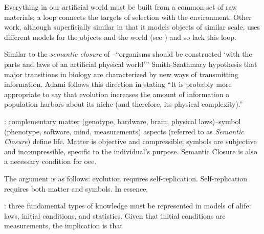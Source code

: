 \begin{NOTES}
Everything in our artificial world must be built from a common set of raw materials; a loop connects the targets of selection with the environment. Other work, although superficially similar in that it models objects of similar scale, uses different models for the objects and the world (see \parencite{Sanchez-Dehesa:2008uq}) and so lack this loop.

Similar to the \emph{semantic closure} of \cite{Pattee1995a}--``organisms should be constructed `with the parts and laws of an artificial physical world''' \cite{Taylor2001}
Smith-Szathmary hypothesis that major transitions in biology are characterized by new ways of transmitting information. Adami follows this direction in stating ``It is probably more appropriate to say that evolution increases the amount of information a population harbors about its niche (and therefore, its physical complexity).'' \cite{Adami2002}

\cite{Pattee1995a}: complementary matter (\eg genotype, hardware, brain, physical laws)--symbol (\eg phenotype, software, mind, measurements) aspects (referred to as \textit{Semantic Closure}) define life. Matter is objective and compressible; symbols are subjective and incompressible, specific to the individual's purpose. Semantic Closure is also a necessary condition for \gls{oee}. \Textcite{VonNeumann1966}

The argument is as follows: evolution requires self-replication. Self-replication requires both matter and symbols. In essence,  

\cite[p.29]{Pattee1995}: three fundamental types of knowledge must be represented in models of \gls{alife}: laws, initial conditions, and statistics. Given that initial conditions are measurements, the implication is that 


\end{NOTES}
